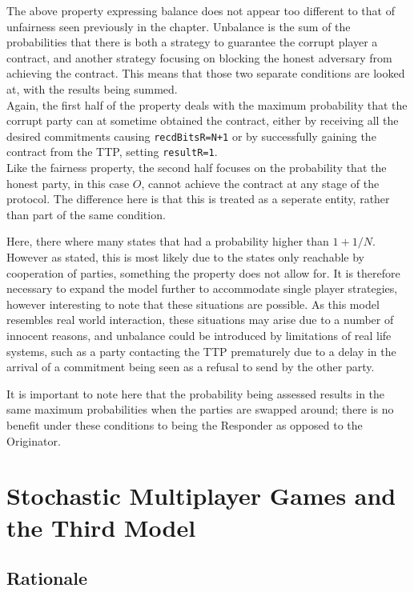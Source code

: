\documentclass{l4proj}
\begin{document}
The above property expressing balance does not appear too different to that of unfairness seen previously in the chapter. Unbalance is the sum of the probabilities that there is both a strategy to guarantee the corrupt player a contract, and another strategy focusing on blocking the honest adversary from achieving the contract. This means that those two separate conditions are looked at, with the results being summed. \\
Again, the first half of the property deals with the maximum probability that the corrupt party can at sometime obtained the contract, either by receiving all the desired commitments causing {\tt recdBitsR=N+1} or by successfully gaining the contract from the TTP, setting {\tt resultR=1}.\\
Like the fairness property, the second half focuses on the probability that the honest party, in this case $O$, cannot achieve the contract at any stage of the protocol. The difference here is that this is treated as a seperate entity, rather than part of the same condition.


Here, there where many states that had a probability higher than $1+1/N$. However as stated, this is most likely due to the states only reachable by cooperation of parties, something the property does not allow for. It is therefore necessary to expand the model further to accommodate single player strategies, however interesting to note that these situations are possible. As this model resembles real world interaction, these situations may arise due to a number of innocent reasons, and unbalance could be introduced by limitations of real life systems, such as a party contacting the TTP prematurely due to a delay in the arrival of a commitment being seen as a refusal to send by the other party.


It is important to note here that the probability being assessed results in the same maximum probabilities when the parties are swapped around; there is no benefit under these conditions to being the Responder as opposed to the Originator.

\chapter{Stochastic Multiplayer Games and the Third Model}

\section{Rationale}
\end{document}
